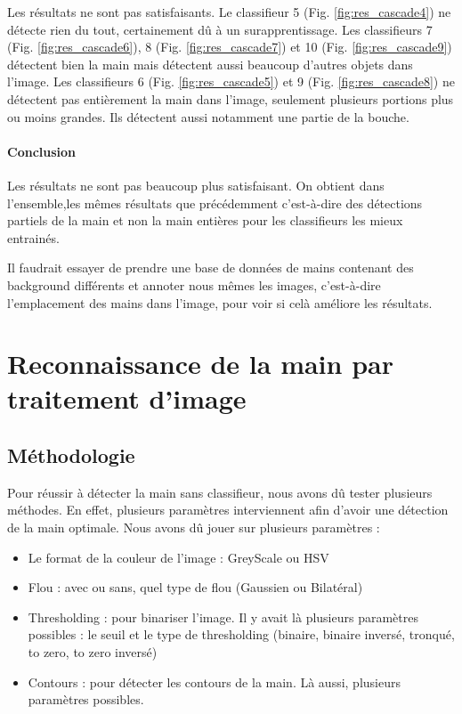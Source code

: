 \documentclass[11pt]{article}
\begin{document}
Les résultats ne sont pas satisfaisants. Le classifieur 5 (Fig. \ref{fig:res_cascade4}) ne détecte rien du tout, certainement dû à un surapprentissage. Les classifieurs 7 (Fig. \ref{fig:res_cascade6}), 8 (Fig. \ref{fig:res_cascade7}) et 10 (Fig. \ref{fig:res_cascade9}) détectent bien la main mais détectent aussi beaucoup d'autres objets dans l'image. Les classifieurs 6 (Fig. \ref{fig:res_cascade5}) et 9 (Fig. \ref{fig:res_cascade8}) ne détectent pas entièrement la main dans l'image, seulement plusieurs portions plus ou moins grandes. Ils détectent aussi notamment une partie de la bouche. 

\paragraph{Conclusion}
Les résultats ne sont pas beaucoup plus satisfaisant. On obtient dans l'ensemble,les mêmes résultats que précédemment c'est-à-dire des détections partiels de la main et non la main entières pour les classifieurs les mieux entrainés.

Il faudrait essayer de prendre une base de données de mains contenant des background différents et annoter nous mêmes les images, c'est-à-dire l'emplacement des mains dans l'image, pour voir si celà améliore les résultats. 

\section{Reconnaissance de la main par traitement d'image}
\subsection{Méthodologie}
Pour réussir à détecter la main sans classifieur, nous avons dû tester plusieurs méthodes. En effet, plusieurs paramètres interviennent afin d'avoir une détection de la main optimale.
Nous avons dû jouer sur plusieurs paramètres :
\begin{itemize}[label=-]
    \item Le format de la couleur de l'image : GreyScale ou HSV
    \item Flou : avec ou sans, quel type de flou (Gaussien ou Bilatéral)
    \item Thresholding : pour binariser l'image. Il y avait là plusieurs paramètres possibles : le seuil et le type de thresholding (binaire, binaire inversé, tronqué, to zero, to zero inversé)
    \item Contours : pour détecter les contours de la main. Là aussi, plusieurs paramètres possibles.
\end{itemize}
\end{document}
